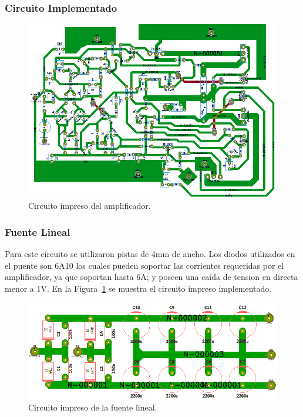 \subsubsection{Circuito Implementado}
\begin{figure}[H]
\centerline{
\includegraphics[width=1\textwidth]{img/circuito_implementado_todo.png}}
\caption{Circuito impreso del amplificador.}
\end{figure}

\subsubsection{Fuente Lineal}
\medskip
Para este circuito se utilizaron pistas de 4mm de ancho. Los diodos utilizados en el puente son 6A10 los cuales pueden soportar las corrientes requeridas por el amplificador, ya que soportan hasta 6A; y poseen una caída de tension en directa menor a 1V.
En la Figura~\ref{circuito_impreso_fuente_lineal} se muestra el circuito impreso implementado. 

\begin{figure}[H]
\centering
\centerline{\includegraphics[width=1\textwidth]{img/circuito_impreso_fuente_lineal.png}}
\caption{Circuito impreso de la fuente lineal.}
\label{circuito_impreso_fuente_lineal} 
\end{figure}
